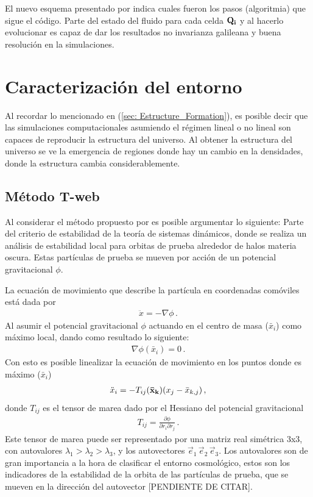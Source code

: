 El nuevo esquema presentado por \cite{springel2010} indica cuales fueron los pasos (algoritmia) que sigue el código. Parte del estado del fluido para cada celda ${\bf{Q_{i}}}$ y al hacerlo evolucionar es capaz de dar los resultados no invarianza galileana y buena resolución en la simulaciones. 

\section{Caracterización del entorno}
\label{sec: Caracterizacion entorno}

Al recordar lo mencionado en (\ref{sec: Estructure_Formation}), es posible decir que las simulaciones computacionales asumiendo el régimen lineal o no lineal son capaces de reproducir la estructura del universo. Al obtener la estructura del universo se ve la emergencia de regiones donde hay un cambio en la densidades, donde la estructura cambia considerablemente.

    \subsection{Método T-web}
    \label{subsec: Metodo_T-web}
Al considerar el método propuesto por \cite{hahn2007} es posible argumentar lo siguiente: Parte del criterio de estabilidad de la teoría de sistemas dinámicos, donde se realiza un análisis de estabilidad local para orbitas de prueba alrededor de halos materia oscura. Estas partículas de prueba se mueven por acción de un potencial gravitacional $\phi$.

La ecuación de movimiento que describe la partícula en coordenadas comóviles está dada por 
\begin{align}
    \ddot{x}=-\nabla\phi\,.
\end{align}
%
Al asumir el potencial gravitacional $\phi$ actuando en el centro de masa ($\bar{x}_{i}$) como máximo local, dando como resultado lo siguiente:
%
\begin{align}
    \nabla\phi(\bar{x}_{i})=0\,.
\end{align}
%
Con esto es posible linealizar la ecuación de movimiento en los puntos donde es máximo ($\bar{x}_{i}$)
%
\begin{align}
    \ddot{x}_{i}=-T_{ij}({\bf{\bar{x}}_{k}})(x_{j}-\bar{x}_{k,j})\,,
\end{align}
%
donde $T_{ij}$ es el tensor de marea dado por el Hessiano del potencial gravitacional
%
\begin{align}
    T_{ij}=\frac{\partial \phi}{\partial r_{i} \partial r_{j}}\,.
\end{align}
%
Este tensor de marea puede ser representado por una matriz real simétrica 3x3, con autovalores $\lambda_{1}>\lambda_{2}>\lambda_{3}$, y los autovectores $\vec{e}_{1}\, \vec{e}_{2}\, \vec{e}_{3}$. Los autovalores son de gran importancia a la hora de clasificar el entorno cosmológico, estos son los indicadores de la estabilidad de la orbita de las partículas de prueba, que se mueven en la dirección del autovector [PENDIENTE DE CITAR].

